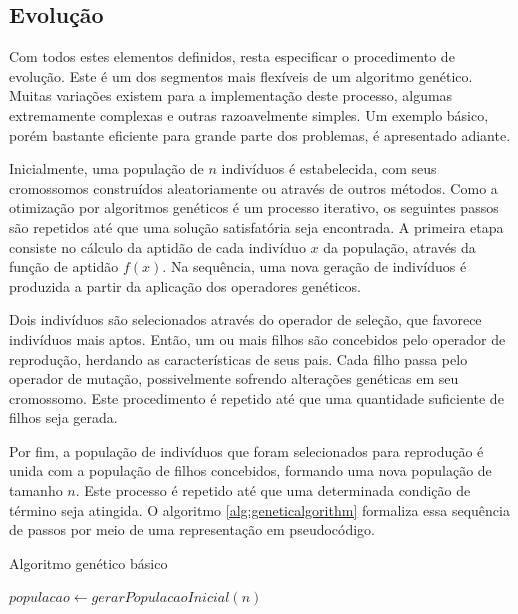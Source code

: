 \documentclass[12pt]{article}
\begin{document}
\subsection{Evolução} \label{sec:evolution}

Com todos estes elementos definidos, resta especificar o procedimento de evolução. Este é um dos segmentos mais flexíveis de um algoritmo genético. Muitas variações existem para a implementação deste processo, algumas extremamente complexas e outras razoavelmente simples. Um exemplo básico, porém bastante eficiente para grande parte dos problemas, é apresentado adiante.

Inicialmente, uma população de $n$ indivíduos é estabelecida, com seus cromossomos construídos aleatoriamente ou através de outros métodos.
Como a otimização por algoritmos genéticos é um processo iterativo, os seguintes passos são repetidos até que uma solução satisfatória seja encontrada. A primeira etapa consiste no cálculo da aptidão de cada indivíduo $x$ da população, através da função de aptidão $f(x)$. Na sequência, uma nova geração de indivíduos é produzida a partir da aplicação dos operadores genéticos.

Dois indivíduos são selecionados através do operador de seleção, que favorece indivíduos mais aptos. Então, um ou mais filhos são concebidos pelo operador de reprodução, herdando as características de seus pais. Cada filho passa pelo operador de mutação, possivelmente sofrendo alterações genéticas em seu cromossomo. Este procedimento é repetido até que uma quantidade suficiente de filhos seja gerada.

Por fim, a população de indivíduos que foram selecionados para reprodução é unida com a população de filhos concebidos, formando uma nova população de tamanho $n$. Este processo é repetido até que uma determinada condição de término seja atingida. O algoritmo \ref{alg:geneticalgorithm} formaliza essa sequência de passos por meio de uma representação em pseudocódigo.

\begin{algorithm}[ht]
  \small
  \DontPrintSemicolon
  \caption{Algoritmo genético básico}
  \label{alg:geneticalgorithm}
  \BlankLine
  $populacao \leftarrow gerarPopulacaoInicial(n)$ \;
  \BlankLine
  \BlankLine
\end{algorithm}
\end{document}
